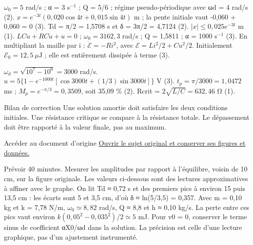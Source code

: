 $\omega_0=5$ rad/s ; α = 3 s$^{-1}$ ; Q = 5/6 ; régime pseudo-périodique avec ωd = 4 rad/s (2). $x=e^{-3t}(0{,}020\cos4t+0{,}015\sin4t)$ m ; la pente initiale vaut -0,060 + 0,060 = 0 (3). Td = π/2 = 1,5708 s et δ = 3π/2 = 4,7124 (2). $|x|\leq0{,}025e^{-3t}$ m (1).
$LC\ddot u+RC\dot u+u=0$ ; $\omega_0=3162{,}3$ rad/s ; Q = 1,5811 ; α = 1000 s$^{-1}$ (3). En multipliant la maille par i : $\dot{\mathcal E}=-Ri^2$, avec $\mathcal E=Li^2/2+Cu^2/2$. Initialement $\mathcal E_0=12{,}5\ \mu\mathrm{ J}$ ; elle est entièrement dissipée à terme (3).


$\omega_d=\sqrt{10^7-10^6}=3000$ rad/s. $u=5\{1-e^{-1000t}[\cos3000t+(1/3)\sin3000t]\}$ V (3). $t_p=\pi/3000=1{,}0472$ ms ; $M_p=e^{-\pi/3}=0{,}3509$, soit 35,09 \% (2). Rcrit = $2\sqrt{L/C}=632{,}46$ Ω (1).
\begin{methode}{Bilan de correction}
Une solution amortie doit satisfaire les deux conditions initiales. Une résistance critique se compare à la résistance totale. Le dépassement doit être rapporté à la valeur finale, pas au maximum.
\end{methode}


\begin{loi}{Accéder au document d’origine}
\href{https://cahier-de-prepa.fr/mp*-condorcet/download?id=98&v=66f32}{Ouvrir le sujet original et conserver ses figures et données.}
\end{loi}
Prévoir 40 minutes. Mesurer les amplitudes par rapport à l’équilibre, voisin de 10 cm, sur la figure originale. Les valeurs ci-dessous sont des lectures approximatives à affiner avec le graphe.
On lit Td ≈ 0,72 s et des premiers pics à environ 15 puis 13,5 cm : les écarts sont 5 et 3,5 cm, d’où δ ≈ ln(5/3,5) = 0,357. Avec m = 0,10 kg et k = 7,78 N/m, $\omega_0\simeq8{,}82$ rad/s, Q ≈ 8,8 et h ≈ 0,10 kg/s. La perte entre ces pics vaut environ $k(0{,}05^2-0{,}035^2)/2\simeq5$ mJ. Pour v0 = 0, conserver le terme sinus de coefficient αX0/ωd dans la solution. La précision est celle d’une lecture graphique, pas d’un ajustement instrumenté.


